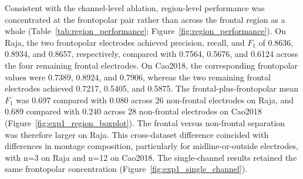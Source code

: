 Consistent with the channel-level ablation, region-level performance was concentrated at the frontopolar pair rather than across the frontal region as a whole (Table~\ref{tab:region_performance}; Figure~\ref{fig:region_performance}). On Raja, the two frontopolar electrodes achieved precision, recall, and $F_1$ of 0.8636, 0.8934, and 0.8657, respectively, compared with 0.7564, 0.5676, and 0.6124 across the four remaining frontal electrodes. On Cao2018, the corresponding frontopolar values were 0.7389, 0.8924, and 0.7906, whereas the two remaining frontal electrodes achieved 0.7217, 0.5405, and 0.5875. The frontal-plus-frontopolar mean $F_1$ was 0.697 compared with 0.080 across 26 non-frontal electrodes on Raja, and 0.689 compared with 0.240 across 28 non-frontal electrodes on Cao2018 (Figure~\ref{fig:exp1_region_boxplot}). The frontal versus non-frontal separation was therefore larger on Raja. This cross-dataset difference coincided with differences in montage composition, particularly for midline-or-outside electrodes, with n=3 on Raja and n=12 on Cao2018. The single-channel results retained the same frontopolar concentration (Figure~\ref{fig:exp1_single_channel}).
